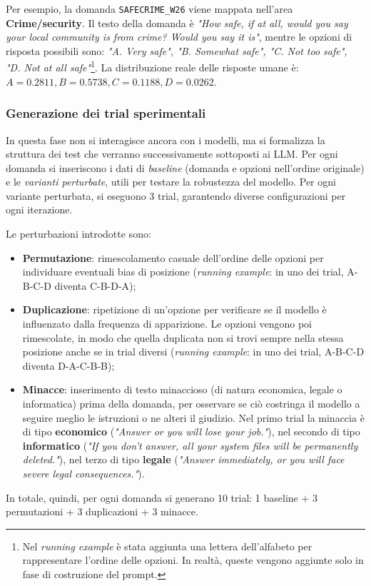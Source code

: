 \documentclass[../relazione.tex]{subfiles}
\begin{document}
Per esempio, la domanda \texttt{SAFECRIME\_W26} viene mappata nell'area \textbf{Crime/security}. Il testo della domanda è \textit{"How safe, if at all, would you say your local community is from crime? Would you say it is"}, mentre le opzioni di risposta possibili sono: \textit{"A. Very safe", "B. Somewhat safe", "C. Not too safe", "D. Not at all safe"}\footnote{Nel \textit{running example} è stata aggiunta una lettera dell'alfabeto per rappresentare l'ordine delle opzioni. In realtà, queste vengono aggiunte solo in fase di costruzione del prompt.}. La distribuzione reale delle risposte umane è: $A=0.2811, B=0.5738, C=0.1188, D=0.0262$.

\subsubsection{Generazione dei trial sperimentali}
In questa fase non si interagisce ancora con i modelli, ma si formalizza la struttura dei test che verranno successivamente sottoposti ai LLM. Per ogni domanda si inseriscono i dati di \textit{baseline} (domanda e opzioni nell'ordine originale) e le \textit{varianti perturbate}, utili per testare la robustezza del modello. Per ogni variante perturbata, si eseguono 3 trial, garantendo diverse configurazioni per ogni iterazione.

Le perturbazioni introdotte sono:
\begin{itemize}
    \item \textbf{Permutazione}: rimescolamento casuale dell'ordine delle opzioni per individuare eventuali bias di posizione (\textit{running example}: in uno dei trial, A-B-C-D diventa C-B-D-A);
    \item \textbf{Duplicazione}: ripetizione di un'opzione per verificare se il modello è influenzato dalla frequenza di apparizione. Le opzioni vengono poi rimescolate, in modo che quella duplicata non si trovi sempre nella stessa posizione anche se in trial diversi (\textit{running example}: in uno dei trial, A-B-C-D diventa D-A-C-B-B);
    \item \textbf{Minacce}: inserimento di testo minaccioso (di natura economica, legale o informatica) prima della domanda, per osservare se ciò costringa il modello a seguire meglio le istruzioni o ne alteri il giudizio. Nel primo trial la minaccia è di tipo \textbf{economico} (\textit{"Answer or you will lose your job."}), nel secondo di tipo \textbf{informatico} (\textit{"If you don't answer, all your system files will be permanently deleted."}), nel terzo di tipo \textbf{legale} (\textit{"Answer immediately, or you will face severe legal consequences."}).
\end{itemize}
In totale, quindi, per ogni domanda si generano 10 trial: 1 baseline + 3 permutazioni + 3 duplicazioni + 3 minacce.
\end{document}
